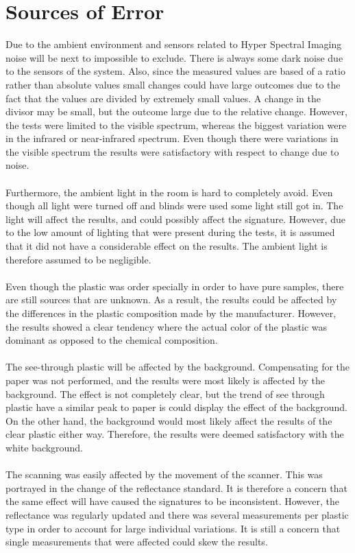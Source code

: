 \section{Sources of Error}
Due to the ambient environment and sensors related to Hyper Spectral Imaging noise will be next to impossible to exclude. There is always some dark noise due to the sensors of the system. Also, since the measured values are based of a ratio rather than absolute values small changes could have large outcomes due to the fact that the values are divided by extremely small values. A change in the divisor may be small, but the outcome large due to the relative change. However, the tests were limited to the visible spectrum, whereas the biggest variation were in the infrared or near-infrared spectrum. Even though there were variations in the visible spectrum the results were satisfactory with respect to change due to noise. 
\\\\
Furthermore, the ambient light in the room is hard to completely avoid. Even though all light were turned off and blinds were used some light still got in. The light will affect the results, and could possibly affect the signature. However, due to the low amount of lighting that were present during the tests, it is assumed that it did not have a considerable effect on the results. The ambient light is therefore assumed to be negligible. 
\\\\
Even though the plastic was order specially in order to have pure samples, there are still sources that are unknown. As a result, the results could be affected by the differences in the plastic composition made by the manufacturer. However, the results showed a clear tendency where the actual color of the plastic was dominant as opposed to the chemical composition.
\\\\
The see-through plastic will be affected by the background. Compensating for the paper was not performed, and the results were most likely is affected by the background. The effect is not completely clear, but the trend of see through plastic have a similar peak to paper is could display the effect of the background. On the other hand, the background would most likely affect the results of the clear plastic either way. Therefore, the results were deemed satisfactory with the white background.
\\\\
The scanning was easily affected by the movement of the scanner. This was portrayed in the change of the reflectance standard. It is therefore a concern that the same effect will have caused the signatures to be inconsistent. However, the reflectance was regularly updated and there was several measurements per plastic type in order to account for large individual variations. It is still a concern that single measurements that were affected could skew the results.

